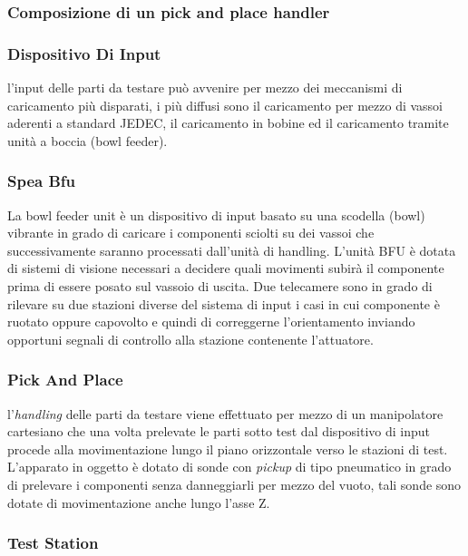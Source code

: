 \subsubsection{Composizione di un pick and place handler }

\subsubsection{Dispositivo Di Input }
l'input delle parti da testare può avvenire per mezzo dei meccanismi di caricamento più disparati, i più 
diffusi sono il caricamento per mezzo di vassoi aderenti a standard JEDEC, il caricamento in bobine ed il 
caricamento tramite unità a boccia (bowl feeder). 

\subsubsection{Spea Bfu} 

La bowl feeder unit è un dispositivo di input basato su una scodella (bowl)
vibrante in grado di caricare i componenti sciolti su dei vassoi che
successivamente saranno processati dall'unità di handling. L'unità BFU è
dotata di sistemi di visione necessari a decidere quali movimenti subirà il
componente prima di essere posato sul vassoio di uscita. Due telecamere sono
in grado di rilevare su due stazioni diverse del sistema  di input i casi in cui
componente è ruotato oppure capovolto e quindi di correggerne l'orientamento
inviando opportuni segnali di controllo alla stazione contenente l'attuatore.

\subsubsection{Pick And Place}

l'\emph{handling} delle parti da testare viene effettuato per mezzo di un manipolatore cartesiano che una volta 
prelevate le parti sotto test dal dispositivo di input procede alla movimentazione lungo il piano orizzontale verso le stazioni di test. L'apparato in oggetto è dotato di sonde con \emph{pickup} di tipo pneumatico in grado di prelevare i componenti senza danneggiarli per mezzo del vuoto, tali sonde sono dotate di 
movimentazione anche lungo l'asse Z.  

\subsubsection{Test Station} 

